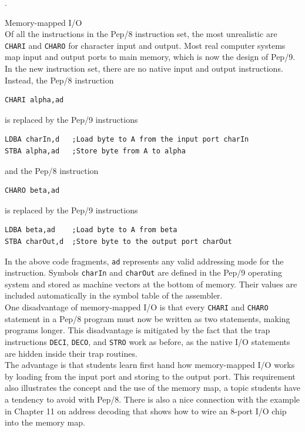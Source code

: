 \documentclass[10pt,fleqn]{book}
\newenvironment{exercises}
   {\begin{list}
      {\arabic{ecounter}.}
      {
         \usecounter{ecounter}
         \setcounter {ecounter}{0}
         \setlength\leftmargin{2pc}
         \setlength\labelwidth{6pc}
         \setlength\labelsep{1pc}
      }}
   {\end{list}}
\newcounter{ecounter}
\begin{document}
\begin{exercises}
\item Memory-mapped I/O\\[6pt]
Of all the instructions in the Pep/8 instruction set, the most unrealistic are \verb|CHARI| and \verb|CHARO| for character input and output.
Most real computer systems map input and output ports to main memory, which is now the design of Pep/9.
In the new instruction set, there are no native input and output instructions.
Instead, the Pep/8 instruction
\begin{verbatim}
CHARI alpha,ad
\end{verbatim}
is replaced by the Pep/9 instructions
\begin{verbatim}
LDBA charIn,d   ;Load byte to A from the input port charIn
STBA alpha,ad   ;Store byte from A to alpha
\end{verbatim}
and the Pep/8 instruction
\begin{verbatim}
CHARO beta,ad
\end{verbatim}
is replaced by the Pep/9 instructions
\begin{verbatim}
LDBA beta,ad    ;Load byte to A from beta
STBA charOut,d  ;Store byte to the output port charOut
\end{verbatim}
In the above code fragments, \verb|ad| represents any valid addressing mode for the instruction.
Symbols \verb|charIn| and \verb|charOut| are defined in the Pep/9 operating system and stored as machine vectors at the bottom of memory.
Their values are included automatically in the symbol table of the assembler.\\[6pt]
One disadvantage of memory-mapped I/O is that every \verb|CHARI| and \verb|CHARO| statement in a Pep/8 program must now be written as two statements, making programs longer.
This disadvantage is mitigated by the fact that the trap instructions \verb|DECI|, \verb|DECO|, and \verb|STRO| work as before, as the native I/O statements are hidden inside their trap routines.\\[6pt]
The advantage is that students learn first hand how memory-mapped I/O works by loading from the input port and storing to the output port.
This requirement also illustrates the concept and the use of the memory map, a topic students have a tendency to avoid with Pep/8.
There is also a nice connection with the example in Chapter 11 on address decoding that shows how to wire an 8-port I/O chip into the memory map.


\end{exercises}
\end{document}
